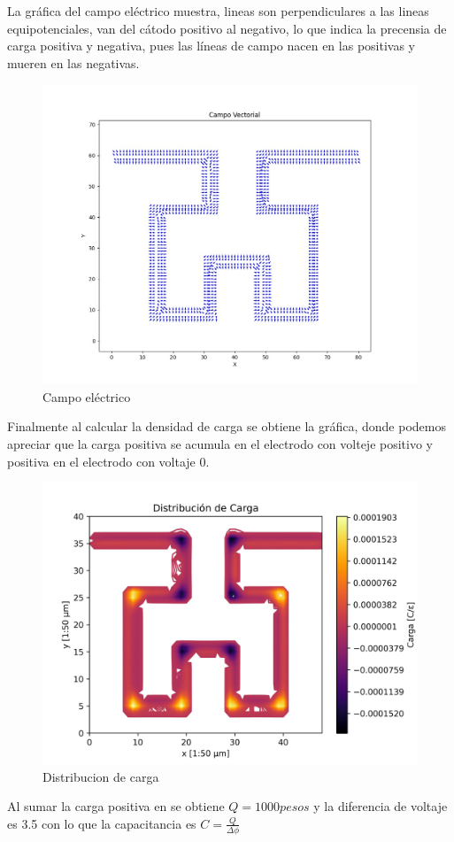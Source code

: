 La gráfica del campo eléctrico muestra, lineas son perpendiculares a las lineas equipotenciales, van del cátodo positivo al negativo, lo que indica la precensia de carga positiva y negativa, pues las líneas de campo nacen en las positivas y mueren en las negativas.  


\begin{figure}[H]
\centering
    \includegraphics[width=1.2\columnwidth]{img/Campo.jpg}
    \caption{Campo eléctrico}
    \label{fig:equipV}
\end{figure}

Finalmente al calcular la densidad de carga se obtiene la gráfica, donde podemos apreciar que la carga positiva se acumula en el electrodo con volteje positivo y positiva en el electrodo con voltaje 0.  

\begin{figure}[H]
\centering
    \includegraphics[width=0.9\columnwidth]{../carga.jpg}
    \caption{Distribucion de carga}
    \label{fig:equipV}
\end{figure}

Al sumar la carga positiva en se obtiene $Q= 1000 pesos $ y la diferencia de voltaje es 3.5 con lo que la capacitancia es $C=\frac{Q}{\Delta\phi}$